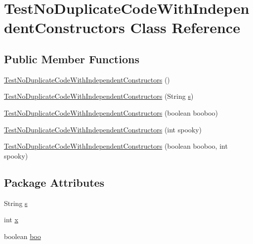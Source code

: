 \hypertarget{classTestNoDuplicateCodeWithIndependentConstructors}{
\section{TestNoDuplicateCodeWithIndependentConstructors Class Reference}
\label{classTestNoDuplicateCodeWithIndependentConstructors}
}
\subsection*{Public Member Functions}
\begin{DoxyCompactItemize}
\item 
\hyperlink{classTestNoDuplicateCodeWithIndependentConstructors_a0fbed481e122f675831437c189b6f477}{TestNoDuplicateCodeWithIndependentConstructors} ()
\item 
\hyperlink{classTestNoDuplicateCodeWithIndependentConstructors_a27913f19693e43fdadae628e579aa53f}{TestNoDuplicateCodeWithIndependentConstructors} (String \hyperlink{classTestNoDuplicateCodeWithIndependentConstructors_a8ef7e3cb54347f1d3d4742360c32050d}{s})
\item 
\hyperlink{classTestNoDuplicateCodeWithIndependentConstructors_a02b69ecacb53a4272b0fe55d3d390bdb}{TestNoDuplicateCodeWithIndependentConstructors} (boolean booboo)
\item 
\hyperlink{classTestNoDuplicateCodeWithIndependentConstructors_a4cb22c47f5f35be04b1819d365e7f12e}{TestNoDuplicateCodeWithIndependentConstructors} (int spooky)
\item 
\hyperlink{classTestNoDuplicateCodeWithIndependentConstructors_ae7fa8ed0789616941a851a4b683b469f}{TestNoDuplicateCodeWithIndependentConstructors} (boolean booboo, int spooky)
\end{DoxyCompactItemize}
\subsection*{Package Attributes}
\begin{DoxyCompactItemize}
\item 
String \hyperlink{classTestNoDuplicateCodeWithIndependentConstructors_a8ef7e3cb54347f1d3d4742360c32050d}{s}
\item 
int \hyperlink{classTestNoDuplicateCodeWithIndependentConstructors_a4c7d7315f9fe7725bacae551f368ae5d}{x}
\item 
boolean \hyperlink{classTestNoDuplicateCodeWithIndependentConstructors_aa8126c449f76fa396e571330195932d9}{boo}
\end{DoxyCompactItemize}


